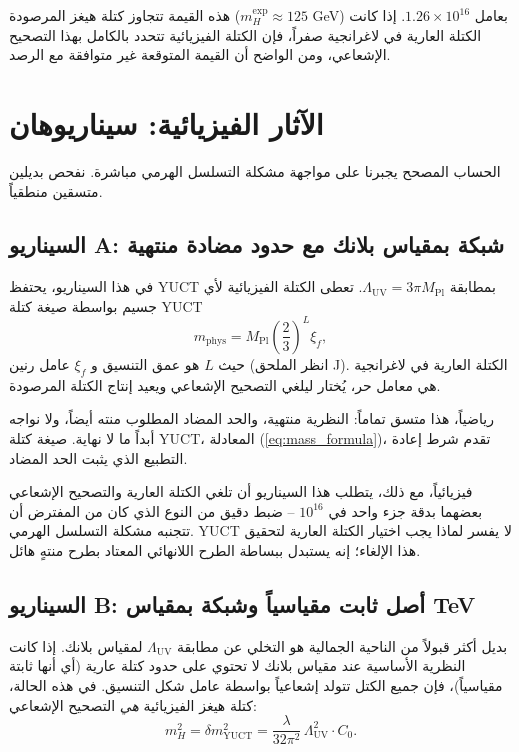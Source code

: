 \documentclass[11pt,a4paper]{article}
\newcommand{\Mpl}{M_{\mathrm{Pl}}}
\newcommand{\LUV}{\Lambda_{\mathrm{UV}}}
\theoremstyle{remark}
\begin{document}
\begin{otherlanguage}{arabic}
		هذه القيمة تتجاوز كتلة هيغز المرصودة (\(m_H^{\mathrm{exp}} \approx 125\) GeV) بعامل \(1.26 \times 10^{16}\). إذا كانت الكتلة العارية في لاغرانجية صفراً، فإن الكتلة الفيزيائية تتحدد بالكامل بهذا التصحيح الإشعاعي، ومن الواضح أن القيمة المتوقعة غير متوافقة مع الرصد.
		
		\section{الآثار الفيزيائية: سيناريوهان}
		\label{sec:scenarios}
		
		الحساب المصحح يجبرنا على مواجهة مشكلة التسلسل الهرمي مباشرة. نفحص بديلين متسقين منطقياً.
		
		\subsection{السيناريو A: شبكة بمقياس بلانك مع حدود مضادة منتهية}
		في هذا السيناريو، يحتفظ YUCT بمطابقة \(\LUV = 3\pi\Mpl\). تعطى الكتلة الفيزيائية لأي جسيم بواسطة صيغة كتلة YUCT
		\begin{equation}
			m_{\mathrm{phys}} = \Mpl \left(\frac{2}{3}\right)^L \xi_f,
			\label{eq:mass_formula}
		\end{equation}
		حيث \(L\) هو عمق التنسيق و \(\xi_f\) عامل رنين (انظر الملحق J). الكتلة العارية في لاغرانجية هي معامل حر، يُختار ليلغي التصحيح الإشعاعي ويعيد إنتاج الكتلة المرصودة.
		
		رياضياً، هذا متسق تماماً: النظرية منتهية، والحد المضاد المطلوب منته أيضاً، ولا نواجه أبداً ما لا نهاية. صيغة كتلة YUCT، المعادلة (\ref{eq:mass_formula})، تقدم شرط إعادة التطبيع الذي يثبت الحد المضاد.
		
		فيزيائياً، مع ذلك، يتطلب هذا السيناريو أن تلغي الكتلة العارية والتصحيح الإشعاعي بعضهما بدقة جزء واحد في \(10^{16}\) – ضبط دقيق من النوع الذي كان من المفترض أن تتجنبه مشكلة التسلسل الهرمي. YUCT لا يفسر لماذا يجب اختيار الكتلة العارية لتحقيق هذا الإلغاء؛ إنه يستبدل ببساطة الطرح اللانهائي المعتاد بطرح منتهٍ هائل.
		
		\subsection{السيناريو B: أصل ثابت مقياسياً وشبكة بمقياس TeV}
		بديل أكثر قبولاً من الناحية الجمالية هو التخلي عن مطابقة \(\LUV\) لمقياس بلانك. إذا كانت النظرية الأساسية عند مقياس بلانك لا تحتوي على حدود كتلة عارية (أي أنها ثابتة مقياسياً)، فإن جميع الكتل تتولد إشعاعياً بواسطة عامل شكل التنسيق. في هذه الحالة، كتلة هيغز الفيزيائية \emph{هي} التصحيح الإشعاعي:
		\begin{equation}
			m_H^2 = \delta m^2_{\mathrm{YUCT}} = \frac{\lambda}{32\pi^2}\,\LUV^2 \cdot C_0.
			\label{eq:scale_inv}
		\end{equation}
		

\end{otherlanguage}
\end{document}

